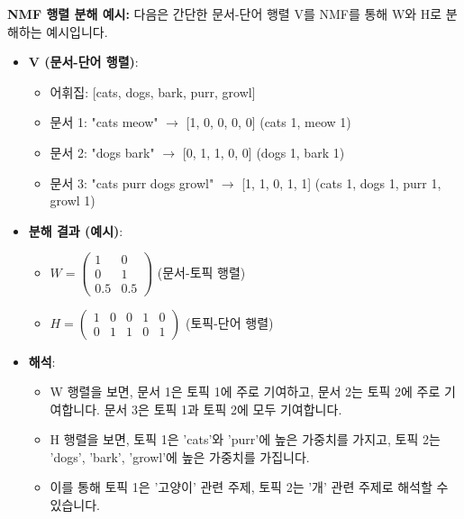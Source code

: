 \documentclass[11pt,a4paper]{article}
\theoremstyle{definition}
\begin{document}
\begin{examplebox}
\textbf{NMF 행렬 분해 예시:}
다음은 간단한 문서-단어 행렬 V를 NMF를 통해 W와 H로 분해하는 예시입니다.
\begin{itemize}
    \item \textbf{V (문서-단어 행렬)}:
    \begin{itemize}
        \item 어휘집: [cats, dogs, bark, purr, growl]
        \item 문서 1: "cats meow" $\rightarrow$ [1, 0, 0, 0, 0] (cats 1, meow 1)
        \item 문서 2: "dogs bark" $\rightarrow$ [0, 1, 1, 0, 0] (dogs 1, bark 1)
        \item 문서 3: "cats purr dogs growl" $\rightarrow$ [1, 1, 0, 1, 1] (cats 1, dogs 1, purr 1, growl 1)
    \end{itemize}
    \item \textbf{분해 결과 (예시)}:
    \begin{itemize}
        \item $W = \begin{pmatrix} 1 & 0 \\ 0 & 1 \\ 0.5 & 0.5 \end{pmatrix}$ (문서-토픽 행렬)
        \item $H = \begin{pmatrix} 1 & 0 & 0 & 1 & 0 \\ 0 & 1 & 1 & 0 & 1 \end{pmatrix}$ (토픽-단어 행렬)
    \end{itemize}
    \item \textbf{해석}:
    \begin{itemize}
        \item W 행렬을 보면, 문서 1은 토픽 1에 주로 기여하고, 문서 2는 토픽 2에 주로 기여합니다. 문서 3은 토픽 1과 토픽 2에 모두 기여합니다.
        \item H 행렬을 보면, 토픽 1은 'cats'와 'purr'에 높은 가중치를 가지고, 토픽 2는 'dogs', 'bark', 'growl'에 높은 가중치를 가집니다.
        \item 이를 통해 토픽 1은 '고양이' 관련 주제, 토픽 2는 '개' 관련 주제로 해석할 수 있습니다.
    \end{itemize}
\end{itemize}
\end{examplebox}
\end{document}
